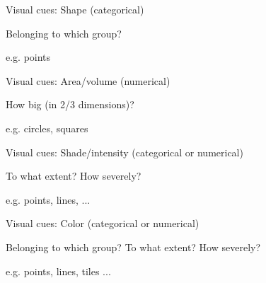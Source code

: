 \documentclass[table]{beamer}\usepackage[]{graphicx}\usepackage[]{color}
\begin{document}

\begin{frame}[fragile]{Visual cues: Shape (categorical)}

\begin{block}{Belonging to which group?}

e.g. points

\end{block}

\vspace{15em}

\end{frame}


\begin{frame}[fragile]{Visual cues: Area/volume (numerical)}

\begin{block}{How big (in 2/3 dimensions)?}

e.g. circles, squares

\end{block}

\vspace{15em}

\end{frame}



\begin{frame}[fragile]{Visual cues: Shade/intensity (categorical or numerical)}

\begin{block}{To what extent? How severely?}

e.g. points, lines, ...

\end{block}

\vspace{15em}

\end{frame}


\begin{frame}[fragile]{Visual cues: Color  (categorical or numerical)}

\begin{block}{Belonging to which group? To what extent? How severely?}

e.g. points, lines, tiles ...

\end{block}

\vspace{15em}

\end{frame}
\end{document}
